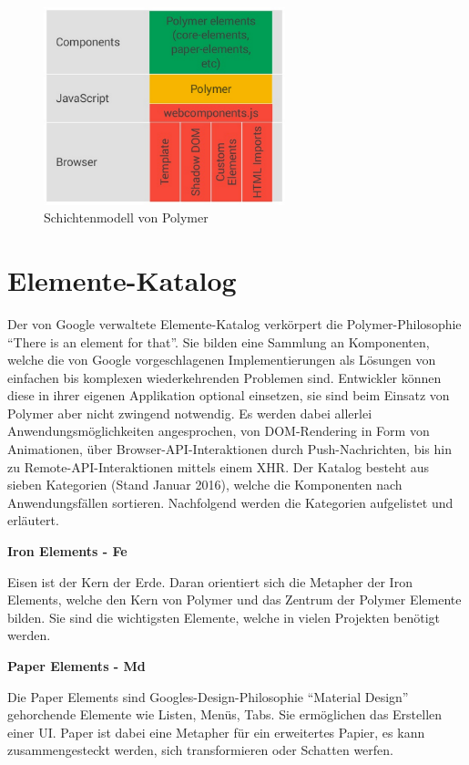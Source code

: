 \begin{figure}[h]
 \centering
 \includegraphics[width=7cm,keepaspectratio]{kapitel3/bilder/1-architektur}
 \caption{Schichtenmodell von Polymer}
 \label{fig:schimopo}
\end{figure}



\section{Elemente-Katalog}\label{elemente-katalog}

Der von Google verwaltete Elemente-Katalog verkörpert die Polymer-Philosophie ``There is an element for that''. Sie bilden eine Sammlung an Komponenten, welche die von Google vorgeschlagenen Implementierungen als Lösungen von einfachen bis komplexen wiederkehrenden Problemen sind. Entwickler können diese in ihrer eigenen Applikation optional einsetzen, sie sind beim Einsatz von Polymer aber nicht zwingend notwendig. Es werden dabei allerlei Anwendungsmöglichkeiten angesprochen, von DOM-Rendering in Form von Animationen, über Browser-API-Interaktionen durch Push-Nachrichten, bis hin zu Remote-API-Interaktionen mittels einem XHR. Der Katalog besteht aus sieben Kategorien (Stand Januar 2016), welche die Komponenten nach Anwendungsfällen sortieren. Nachfolgend werden die Kategorien aufgelistet und erläutert.


\textbf{Iron Elements - Fe}

Eisen ist der Kern der Erde. Daran orientiert sich die Metapher der Iron Elements, welche den Kern von Polymer und das Zentrum der Polymer Elemente bilden. Sie sind die wichtigsten Elemente, welche in vielen Projekten benötigt werden.

\textbf{Paper Elements - Md}

Die Paper Elements sind Googles-Design-Philosophie ``Material Design'' gehorchende Elemente wie Listen, Menüs, Tabs. Sie ermöglichen das Erstellen einer UI. Paper ist dabei eine Metapher für ein erweitertes Papier, es kann zusammengesteckt werden, sich transformieren oder Schatten werfen.

